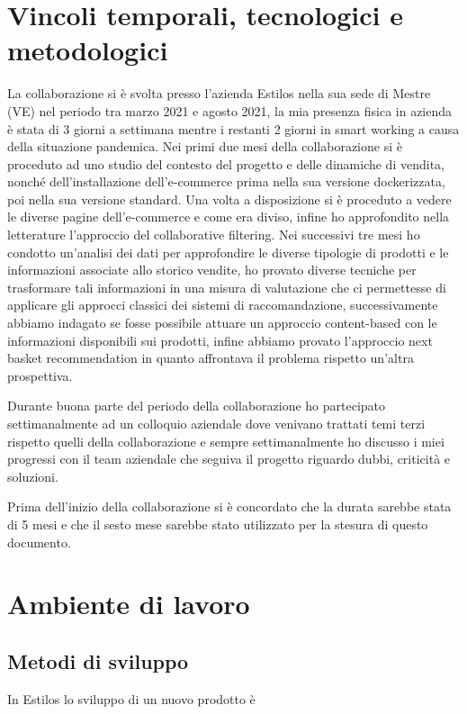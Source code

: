 \section{Vincoli temporali, tecnologici e metodologici}
La collaborazione si è svolta presso l'azienda Estilos nella sua sede di Mestre (VE) nel periodo tra marzo 2021 e agosto 2021, la mia presenza fisica in azienda è stata di 3 giorni a settimana mentre i restanti 2 giorni in smart working a causa della situazione pandemica. 
Nei primi due mesi della collaborazione si è proceduto ad uno studio del contesto del progetto e delle dinamiche di vendita, nonché dell'installazione dell'e-commerce prima nella sua versione dockerizzata, poi nella sua versione standard. Una volta a disposizione si è proceduto a vedere le diverse pagine dell'e-commerce e come era diviso, infine ho approfondito nella letterature l'approccio del collaborative filtering.
Nei successivi tre mesi ho condotto un'analisi dei dati per approfondire le diverse tipologie di prodotti e le informazioni associate allo storico vendite, ho provato diverse tecniche per trasformare tali informazioni in una misura di valutazione che ci permettesse di applicare gli approcci classici dei sistemi di raccomandazione, successivamente abbiamo indagato se fosse possibile attuare un approccio content-based con le informazioni disponibili sui prodotti, infine abbiamo provato l'approccio next basket recommendation in quanto affrontava il problema rispetto un'altra prospettiva.

Durante buona parte del periodo della collaborazione ho partecipato settimanalmente ad un colloquio aziendale dove venivano trattati temi terzi rispetto quelli della collaborazione e sempre settimanalmente ho discusso i miei progressi con il team aziendale che seguiva il progetto riguardo dubbi, criticità e soluzioni.

Prima dell'inizio della collaborazione si è concordato che la durata sarebbe stata di 5 mesi e che il sesto mese sarebbe stato utilizzato per la stesura di questo documento. 

\section{Ambiente di lavoro}
\subsection{Metodi di sviluppo}
In Estilos lo sviluppo di un nuovo prodotto è 



